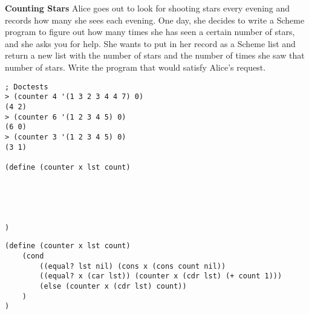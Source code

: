 \begin{blocksection}
\textbf{Counting Stars}
\question Alice goes out to look for shooting stars every evening and records how many she sees each evening. One day, she decides to write a Scheme program to figure out how many times she has seen a certain number of stars, and she asks you for help. She wants to put in her record as a Scheme list and return a new list with the number of stars and the number of times she saw that number of stars. Write the program that would satisfy Alice’s request.

\begin{lstlisting}
; Doctests
> (counter 4 '(1 3 2 3 4 4 7) 0)
(4 2)
> (counter 6 '(1 2 3 4 5) 0)
(6 0)
> (counter 3 '(1 2 3 4 5) 0)
(3 1)

(define (counter x lst count)





)
\end{lstlisting}

\begin{solution}
\begin{lstlisting}
(define (counter x lst count)
    (cond
        ((equal? lst nil) (cons x (cons count nil))
        ((equal? x (car lst)) (counter x (cdr lst) (+ count 1)))
        (else (counter x (cdr lst) count))
    )
)
\end{lstlisting}
\end{solution}
\end{blocksection}
